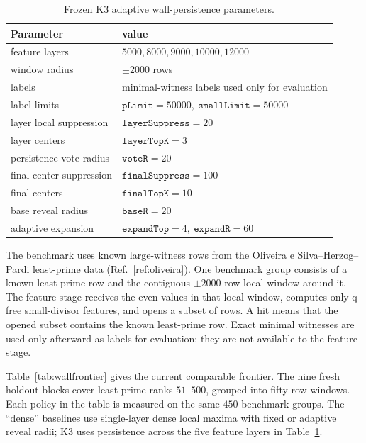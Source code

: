 \documentclass[11pt]{article}
\begin{document}
\begin{table}[!htbp]
\centering
\caption{Frozen K3 adaptive wall-persistence parameters.}
\label{tab:k3params}
\begin{tabular}{ll}
\toprule
Parameter & value \\
\midrule
feature layers & \(5000,8000,9000,10000,12000\) \\
window radius & \(\pm2000\) rows \\
labels & minimal-witness labels used only for evaluation \\
label limits & \(\texttt{pLimit}=50000,\ \texttt{smallLimit}=50000\) \\
layer local suppression & \(\texttt{layerSuppress}=20\) \\
layer centers & \(\texttt{layerTopK}=3\) \\
persistence vote radius & \(\texttt{voteR}=20\) \\
final center suppression & \(\texttt{finalSuppress}=100\) \\
final centers & \(\texttt{finalTopK}=10\) \\
base reveal radius & \(\texttt{baseR}=20\) \\
adaptive expansion & \(\texttt{expandTop}=4,\ \texttt{expandR}=60\) \\
\bottomrule
\end{tabular}
\end{table}

The benchmark uses known large-witness rows from the Oliveira
e Silva--Herzog--Pardi least-prime data (Ref.~\ref{ref:oliveira}). One
benchmark group consists of a known least-prime row and the contiguous
\(\pm2000\)-row local window around it. The feature stage receives the even
values in that local window, computes only q-free small-divisor features, and
opens a subset of rows. A hit means that the opened subset contains the known
least-prime row. Exact minimal witnesses are used only afterward as labels for
evaluation; they are not available to the feature stage.

Table~\ref{tab:wallfrontier} gives the current comparable frontier. The nine
fresh holdout blocks cover least-prime ranks \(51\)--\(500\), grouped into
fifty-row windows. Each policy in the table is measured on the same \(450\)
benchmark groups. The ``dense'' baselines use single-layer dense local maxima
with fixed or adaptive reveal radii; K3 uses persistence across the five
feature layers in Table~\ref{tab:k3params}.
\end{document}
